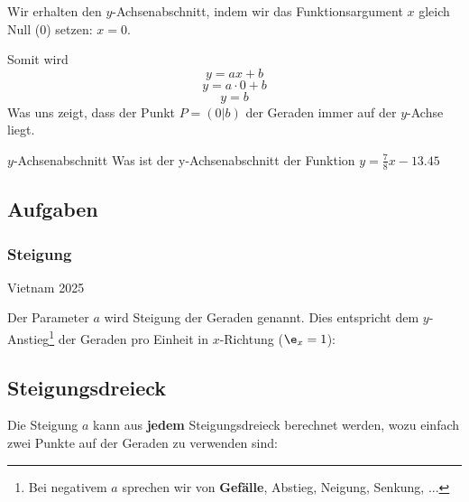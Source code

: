 Wir erhalten den $y$-Achsenabschnitt, indem wir das Funktionsargument $x$
gleich Null (0) setzen: $x=0$.

Somit wird
$$y=ax+b$$
$$y=a\cdot{}0+b$$
$$y=b$$
Was uns zeigt, dass der  Punkt $P=(0|b)$ der Geraden immer auf der $y$-Achse liegt.

\begin{beispiel}{$y$-Achsenabschnitt}{}
  Was ist der y-Achsenabschnitt der Funktion $y=\frac78 x- 13.45$

\end{beispiel}


\subsection*{Aufgaben}





\newpage


\subsubsection{Steigung}
  \begin{center}\tiny{Vietnam 2025}\end{center}
  
Der Parameter $a$ wird Steigung der Geraden genannt. Dies entspricht
dem $y$-Anstieg\footnote{Bei negativem $a$ sprechen wir von \textbf{Gefälle},
  Abstieg, Neigung, Senkung, ...} der Geraden pro Einheit in
$x$-Richtung ($\e_x = 1$):



\newpage
\subsection*{Steigungsdreieck}
Die Steigung $a$ kann aus \textbf{jedem} Steigungsdreieck berechnet werden,
wozu einfach zwei Punkte auf der Geraden zu verwenden sind:

